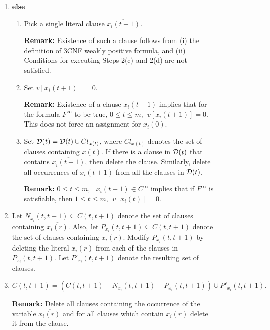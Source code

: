 {\begin{figure}[tbp]
\begin{enumerate}
\begin{enumerate}
\begin{enumerate}
\begin{enumerate}
\item
If there is a clause in ${\cal D}(t)$ 
that contains $\overline{x_i(r)}$, then delete the clause.
Similarly, delete all occurrences of $x_i(r)$ from all the clauses
in ${\cal D}(t)$.

\end{enumerate}


\item
{\bf else}

\begin{enumerate}
\item
Pick a single literal clause $\overline{x_i(t+1)}$.

\noindent
{\bf Remark:} Existence of such a clause follows from 
(i) the definition of 3CNF weakly positive formula, and 
(ii) Conditions for executing Steps 2(c) and 2(d) are not satisfied.

\item
Set $v[x_i(t+1)] = 0$.

\noindent
{\bf Remark:}
Existence of a clause $\overline{x_i(t+1)}$ 
implies that for the formula $F^{\infty}$ to be true, 
$0 \leq t \leq m,~~ v[x_i(t+1)] = 0$. This does not force an assignment for
$x_i(0)$.


\item
Set ${\cal D}(t) = {\cal D}(t) \cup Cl_{x(t)}$, where $Cl_{x(t)}$ denotes the
set of clauses containing $x(t)$.
If there is a clause in ${\cal D}(t)$ that contains $\overline{x_i(t+1)}$, 
then delete the clause.
Similarly, delete all occurrences of $x_i(t+1)$ 
from all the clauses in ${\cal D}(t)$.

\noindent
{\bf Remark:} $0 \leq t \leq m,~~~ \overline{x_i(t+1)} \in C^{\infty}$ 
implies that if $F^{\infty}$ is satisfiable,  then
$1 \leq t \leq m , ~~ v[x_i(t)] = 0$.
\end{enumerate}


\item
Let $N_{x_i}(t, t+1) \subseteq C(t, t+1)$ denote the set of clauses 
containing $\overline{x_i(r)}$. Also, let 
$P_{x_i}(t, t+1) \subseteq C(t, t+1)$ denote the set of clauses containing 
$x_i(r)$. Modify $P_{x_i}(t, t+1)$ by deleting the literal 
$x_i(r)$ from each of the clauses in $P_{x_i}(t, t+1)$. 
Let $P'_{x_i}(t, t+1)$ denote the resulting set of clauses.



\item $C(t,t+1) = \left( C(t, t+1) - N_{x_i}(t, t+1) - P_{x_i}(t, t+1) \right) 
\cup P'_{x_i}(t, t+1).$

\noindent
{\bf Remark:}
Delete all clauses containing  the occurrence of the variable 
$\overline{x_i(r)}$ and for all clauses which contain
$x_i(r)$ delete it from the clause. 




\end{enumerate}
\end{enumerate}
\end{enumerate}
\end{figure}}
